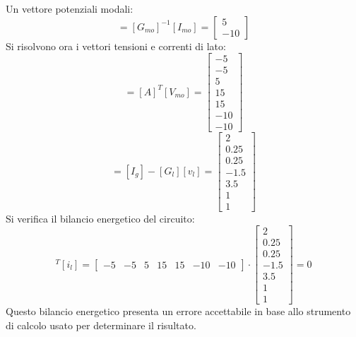 \documentclass{article}
\numberwithin{equation}{subsection}
\begin{document}
Un vettore potenziali modali:
\begin{equation*}
    [V_{mo}]=[G_{mo}]^{-1}[I_{mo}]=\begin{bmatrix}
        5\\
        -10
    \end{bmatrix}
\end{equation*}
Si risolvono ora i vettori tensioni e correnti di lato:
\begin{equation*}
    [v_l]=[A]^T[V_{mo}]=\begin{bmatrix}
        -5\\
        -5\\
        5\\
        15\\
        15\\
        -10\\
        -10
    \end{bmatrix}
\end{equation*}
\begin{equation*}
    [i_l]=[I_g]-[G_l][v_l]=\begin{bmatrix}
        2\\
        0.25\\
        0.25\\
        -1.5\\
        3.5\\
        1\\
        1
    \end{bmatrix}
\end{equation*}
Si verifica il bilancio energetico del circuito:
\begin{equation*}
    [v_l]^T[i_l]=\begin{bmatrix}
        -5&
        -5&
        5&
        15&
        15&
        -10&
        -10
    \end{bmatrix}\cdot\begin{bmatrix}
        2\\
        0.25\\
        0.25\\
        -1.5\\
        3.5\\
        1\\
        1
    \end{bmatrix}
    =0
\end{equation*}
Questo bilancio energetico presenta un errore accettabile in base allo strumento di calcolo usato per determinare il risultato. 
\end{document}
